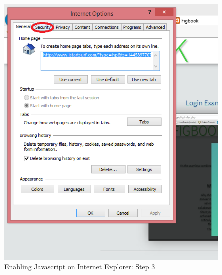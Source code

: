 		\begin{figure}[!h]
		\centering
			\includegraphics[scale=0.7]{images/javascriptIE3.png}
			\caption{Enabling Javascript on Internet Explorer: Step 3}
		\end{figure}
		
